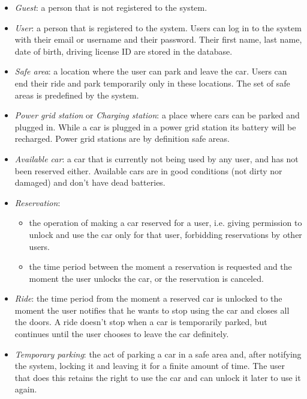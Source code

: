 \documentclass[english]{article}
\begin{document}
\begin{itemize}
\item{\textit{Guest}: a person that is not registered to the system.}
\item{\textit{User}: a person that is registered to the system. Users can log in to the system with their email or username and their password. Their first name, last name, date of birth, driving license ID are stored in the database.}
\item{\textit{Safe area}: a location where the user can park and leave the car. Users can end their ride and park temporarily only in these locations. The set of safe areas is predefined by the system.}
\item{\textit{Power grid station} or \textit{Charging station}: a place where cars can be parked and plugged in. While a car is plugged in a power grid station its battery will be recharged. Power grid stations are by definition safe areas.}
\item{\textit{Available car}: a car that is currently not being used by any user, and has not been reserved either. Available cars are in good conditions (not dirty nor damaged) and don’t have dead batteries.}
\item{\textit{Reservation}:
	\begin{itemize}
		\item{the operation of making a car reserved for a user, i.e. giving permission to unlock and use the car only for that user, forbidding reservations by other users.}
		\item{the time period between the moment a reservation is requested and the moment the user unlocks the car, or the reservation is canceled.}
	\end{itemize}
}
\item{\textit{Ride}: the time period from the moment a reserved car is unlocked to the moment the user notifies that he wants to stop using the car and closes all the doors. A ride doesn’t stop when a car is temporarily parked, but continues until the user chooses to leave the car definitely.}
\item{\textit{Temporary parking}: the act of parking a car in a safe area and, after notifying the system, locking it and leaving it for a finite amount of time. The user that does this retains the right to use the car and can unlock it later to use it again.}

\end{itemize}
\end{document}
